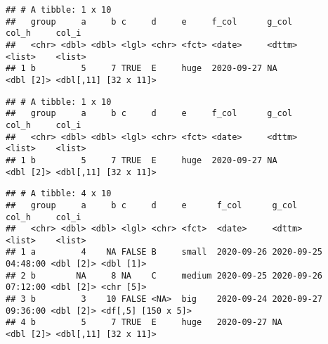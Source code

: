 \documentclass[
]{book}
\newenvironment{Shaded}{\begin{snugshade}}{\end{snugshade}}
\newcommand{\DecValTok}[1]{\textcolor[rgb]{0.00,0.00,0.81}{#1}}
\newcommand{\KeywordTok}[1]{\textcolor[rgb]{0.13,0.29,0.53}{\textbf{#1}}}
\newcommand{\NormalTok}[1]{#1}
\newcommand{\OperatorTok}[1]{\textcolor[rgb]{0.81,0.36,0.00}{\textbf{#1}}}
\newcommand{\StringTok}[1]{\textcolor[rgb]{0.31,0.60,0.02}{#1}}
\begin{document}
\begin{verbatim}
## # A tibble: 1 x 10
##   group     a     b c     d     e     f_col      g_col               col_h     col_i               
##   <chr> <dbl> <dbl> <lgl> <chr> <fct> <date>     <dttm>              <list>    <list>              
## 1 b         5     7 TRUE  E     huge  2020-09-27 NA                  <dbl [2]> <dbl[,11] [32 x 11]>
\end{verbatim}

\begin{Shaded}
\end{Shaded}

\begin{verbatim}
## # A tibble: 1 x 10
##   group     a     b c     d     e     f_col      g_col               col_h     col_i               
##   <chr> <dbl> <dbl> <lgl> <chr> <fct> <date>     <dttm>              <list>    <list>              
## 1 b         5     7 TRUE  E     huge  2020-09-27 NA                  <dbl [2]> <dbl[,11] [32 x 11]>
\end{verbatim}

\begin{Shaded}
\end{Shaded}

\begin{verbatim}
## # A tibble: 4 x 10
##   group     a     b c     d     e      f_col      g_col               col_h     col_i               
##   <chr> <dbl> <dbl> <lgl> <chr> <fct>  <date>     <dttm>              <list>    <list>              
## 1 a         4    NA FALSE B     small  2020-09-26 2020-09-25 04:48:00 <dbl [2]> <dbl [1]>           
## 2 b        NA     8 NA    C     medium 2020-09-25 2020-09-26 07:12:00 <dbl [2]> <chr [5]>           
## 3 b         3    10 FALSE <NA>  big    2020-09-24 2020-09-27 09:36:00 <dbl [2]> <df[,5] [150 x 5]>  
## 4 b         5     7 TRUE  E     huge   2020-09-27 NA                  <dbl [2]> <dbl[,11] [32 x 11]>
\end{verbatim}
\end{document}
